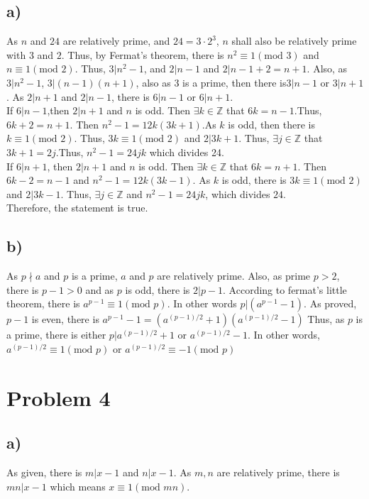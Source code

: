 \documentclass{article}
\begin{document}
\subsection*{a)}
As \(n\) and \(24\) are relatively prime, and \(24=3\cdot 2^3\), \(n\) shall also be relatively prime with \(3\) and \(2\). 
Thus, by Fermat's theorem, there is \(n^2\equiv 1 (\text{mod }3)\) and \(n\equiv 1 (\text{mod }2)\). Thus, \(3|n^2-1\), and 
\(2|n-1\) and \(2|n-1+2=n+1\). Also, as \(3|n^2-1\), \(3|(n-1)(n+1)\), also as \(3\) is a prime, 
then there is\(3|n-1\) or \(3|n+1\). As \(2|n+1\) and \(2|n-1\), there is \(6|n-1\) or \(6|n+1\).\\
If \(6|n-1\),then \(2|n+1\) and \(n\) is odd. Then \(\exists k\in \mathbb{Z}\) that \(6k=n-1\).Thus, \(6k+2=n+1\). Then \(n^2-1=12k(3k+1)\).As \(k\) is odd,
then there is \(k\equiv 1 (\text{mod }2)\). Thus, \(3k\equiv 1 (\text{mod }2)\) and \(2|3k+1\). Thus, \(\exists j\in \mathbb{Z}\) that 
\(3k+1=2j\).Thus, \(n^2-1=24jk\) which divides 24.\\
If \(6|n+1\), then \(2|n+1\) and \(n\) is odd. Then \(\exists k\in\mathbb{Z}\) that \(6k=n+1\). Then \(6k-2=n-1\) and \(n^2-1=12k(3k-1)\).
As \(k\) is odd, there is \(3k\equiv 1 (\text{mod }2)\) and \(2|3k-1\). Thus, \(\exists j \in \mathbb{Z}\) and \(n^2-1=24jk\), which divides \(24\).\\
Therefore, the statement is true.
\subsection*{b)}
As \(p\nmid a\) and \(p\) is a prime, \(a\) and \(p\) are relatively prime. Also, as prime \(p>2\), there is \(p-1>0\) and as 
\(p\) is odd, there is \(2|p-1\). According to fermat's little theorem, there is \(a^{p-1}\equiv 1 (\text{mod }p)\). In other words
\(p|(a^{p-1}-1)\). As proved, \(p-1\) is even, there is \(a^{p-1}-1=(a^{(p-1)/2}+1)(a^{(p-1)/2}-1)\)
Thus, as \(p\) is a prime, there is either \(p|a^{(p-1)/2}+1\) or \(a^{(p-1)/2}-1\). In other words, 
\(a^{(p-1)/2}\equiv 1 (\text{mod }p)\) or \(a^{(p-1)/2}\equiv -1(\text{mod }p)\)

\section*{Problem 4}
\subsection*{a)}
As given, there is \(m|x-1\) and \(n|x-1\). As \(m,n\) are relatively prime, there is \(mn|x-1\) which means \(x\equiv 1 (\text{mod }mn)\).
\end{document}
